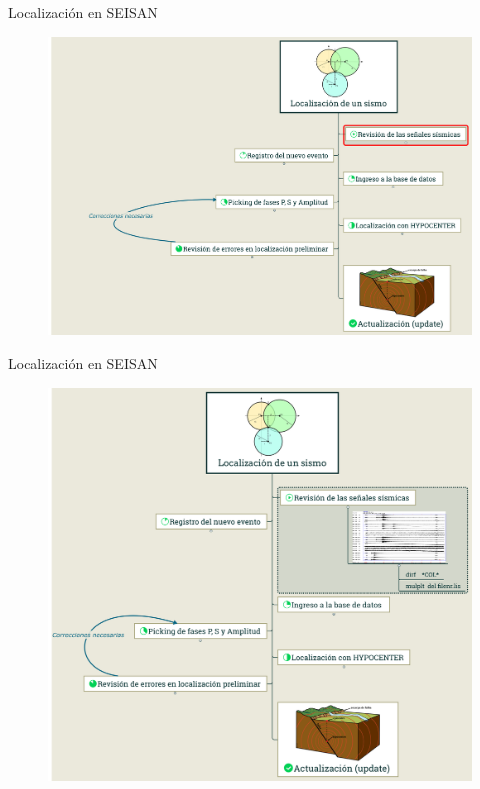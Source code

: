 \documentclass[11pt]{beamer}
\begin{document}
\begin{frame}{Localización en SEISAN}
\begin{figure}
\includegraphics[scale=0.15]{localizacion_1_1.png}
\end{figure}
\end{frame}

\begin{frame}{Localización en SEISAN}
\begin{figure}
\includegraphics[scale=0.15]{localizacion_2.png}
\end{figure}
\end{frame}
\end{document}
